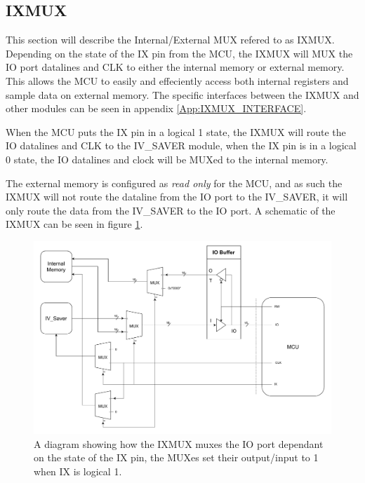 \subsection{IXMUX} \label{subsec:IXMUX}
This section will describe the Internal/External MUX refered to as IXMUX. Depending on the state of the IX pin from the MCU, the IXMUX
will MUX the IO port datalines and CLK to either the internal memory or external memory. This allows the MCU to easily and effeciently
 access both internal registers and sample data on external memory. The specific interfaces between the IXMUX and other modules can be
 seen in appendix \ref{App:IXMUX_INTERFACE}.

When the MCU puts the IX pin in a logical 1 state, the IXMUX will route the IO datalines and CLK to the IV\_SAVER
module, when the IX pin is in a logical 0 state, the IO datalines and clock will be MUXed to the internal memory. 

The external memory is configured as \textit{read only} for the MCU, and as such the IXMUX will not route the dataline from the IO port to the IV\_SAVER, it will only route the data from the IV\_SAVER to the IO port. A schematic of the IXMUX can be seen in figure \ref{fig_7_2_1.5_IXMUX_schematic}.

\begin{figure}[H]
    \centering
    \includegraphics[clip, trim=0 0 0 0, width=1\textwidth]{Sections/7_SystemDesign/Figures/IXMUX_Functionality.pdf}
    \caption{A diagram showing how the IXMUX muxes the IO port dependant on the state of the IX pin, the MUXes set their output/input to 1 when IX is logical 1.}
    \label{fig_7_2_1.5_IXMUX_schematic}
\end{figure}

